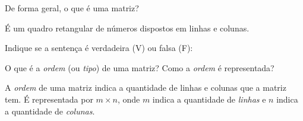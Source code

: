 \documentclass[pdftex, brazil, 12pt, oneside, addpoints]{exam}
\newcommand{\vf}[1][{}]{%
  \fillin[#1][0.25in]%
}
\begin{document}
\newpage

\begin{questions}
\setlength\linefillthickness{0.2pt}

\question
De forma geral, o que é uma matriz?
\begin{solutionorlines}[0.50in]
  É um quadro retangular de números dispostos em linhas e colunas.
\end{solutionorlines}

\question
Indique se a sentença é verdadeira (V) ou falsa (F):

\question
O que é a \emph{ordem} (ou \emph{tipo}) de uma matriz? Como a \emph{ordem} é
representada?
\begin{solutionorlines}[0.75in]
  A \emph{ordem} de uma matriz indica a quantidade de linhas e colunas que a matriz
  tem. É representada por $m \times n$, onde $m$ indica a quantidade de \emph{linhas}
  e $n$ indica a quantidade de \emph{colunas}.
\end{solutionorlines}


\end{questions}
\end{document}
